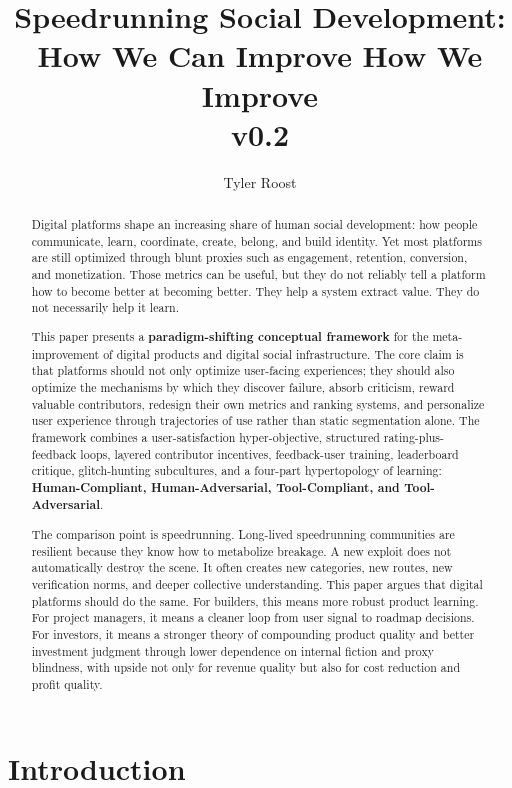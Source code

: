 \documentclass[11pt]{article}
\title{Speedrunning Social Development: How We Can Improve How We Improve\\\large v0.2}
\author{Tyler Roost}
\date{}
\begin{document}
\maketitle

\begin{abstract}
Digital platforms shape an increasing share of human social development: how people communicate, learn, coordinate, create, belong, and build identity. Yet most platforms are still optimized through blunt proxies such as engagement, retention, conversion, and monetization. Those metrics can be useful, but they do not reliably tell a platform how to become better at becoming better. They help a system extract value. They do not necessarily help it learn.

This paper presents a \textbf{paradigm-shifting conceptual framework} for the meta-improvement of digital products and digital social infrastructure. The core claim is that platforms should not only optimize user-facing experiences; they should also optimize the mechanisms by which they discover failure, absorb criticism, reward valuable contributors, redesign their own metrics and ranking systems, and personalize user experience through trajectories of use rather than static segmentation alone. The framework combines a user-satisfaction hyper-objective, structured rating-plus-feedback loops, layered contributor incentives, feedback-user training, leaderboard critique, glitch-hunting subcultures, and a four-part hypertopology of learning: \textbf{Human-Compliant, Human-Adversarial, Tool-Compliant, and Tool-Adversarial}.

The comparison point is speedrunning. Long-lived speedrunning communities are resilient because they know how to metabolize breakage. A new exploit does not automatically destroy the scene. It often creates new categories, new routes, new verification norms, and deeper collective understanding. This paper argues that digital platforms should do the same. For builders, this means more robust product learning. For project managers, it means a cleaner loop from user signal to roadmap decisions. For investors, it means a stronger theory of compounding product quality and better investment judgment through lower dependence on internal fiction and proxy blindness, with upside not only for revenue quality but also for cost reduction and profit quality.
\end{abstract}

\section{Introduction}
\end{document}
